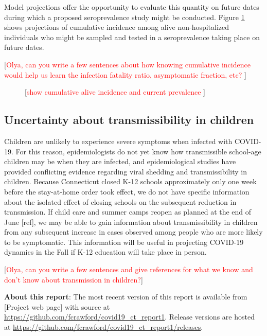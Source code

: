 \documentclass[11pt]{article}
\newcommand{\comment}[1]{[\textcolor{red}{#1}]}
\begin{document}
Model projections offer the opportunity to evaluate this quantity on future dates during which a proposed seroprevalence study might be conducted.  Figure \ref{fig:cumincidence} shows projections of cumulative incidence among alive non-hospitalized individuals who might be sampled and tested in a seroprevalence taking place on future dates.  

\comment{Olya, can you write a few sentences about how knowing cumulative incidence would help us learn the infection fatality ratio, asymptomatic fraction, etc? }


\begin{figure}
\centering
\caption{\comment{show cumulative alive incidence and current prevalence }}
\label{fig:cumincidence}
\end{figure}





\subsection*{Uncertainty about transmissibility in children}

Children are unlikely to experience severe symptoms when infected with COVID-19. For this reason, epidemiologists do not yet know how transmissible school-age children may be when they are infected, and epidemiological studies have provided conflicting evidence regarding viral shedding and transmissibility in children. Because Connecticut closed K-12 schools approximately only one week before the stay-at-home order took effect, we do not have specific information about the isolated effect of closing schools on the subsequent reduction in transmission.  If child care and summer camps reopen as planned at the end of June [ref], we may be able to gain information about transmissibility in children from any subsequent increase in cases observed among people who are more likely to be symptomatic.  This information will be useful in projecting COVID-19 dynamics in the Fall if K-12 education will take place in person. 


\comment{Olya, can you write a few sentences and give references for what we know and don't know about transmission in children?}




\textbf{About this report}: The most recent version of this report is available from [Project web page] with source at \url{https://github.com/fcrawford/covid19_ct_report1}. Release versions are hosted at \url{https://github.com/fcrawford/covid19_ct_report1/releases}. 
\end{document}
